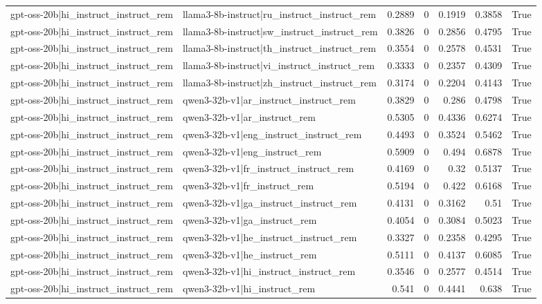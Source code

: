 \begin{table}
\begin{tabular}{l l r r r r l}
gpt-oss-20b|hi_instruct_instruct_rem & llama3-8b-instruct|ru_instruct_instruct_rem & 0.2889 & 0 & 0.1919 & 0.3858 & True \\
gpt-oss-20b|hi_instruct_instruct_rem & llama3-8b-instruct|sw_instruct_instruct_rem & 0.3826 & 0 & 0.2856 & 0.4795 & True \\
gpt-oss-20b|hi_instruct_instruct_rem & llama3-8b-instruct|th_instruct_instruct_rem & 0.3554 & 0 & 0.2578 & 0.4531 & True \\
gpt-oss-20b|hi_instruct_instruct_rem & llama3-8b-instruct|vi_instruct_instruct_rem & 0.3333 & 0 & 0.2357 & 0.4309 & True \\
gpt-oss-20b|hi_instruct_instruct_rem & llama3-8b-instruct|zh_instruct_instruct_rem & 0.3174 & 0 & 0.2204 & 0.4143 & True \\
gpt-oss-20b|hi_instruct_instruct_rem & qwen3-32b-v1|ar_instruct_instruct_rem & 0.3829 & 0 & 0.286 & 0.4798 & True \\
gpt-oss-20b|hi_instruct_instruct_rem & qwen3-32b-v1|ar_instruct_rem & 0.5305 & 0 & 0.4336 & 0.6274 & True \\
gpt-oss-20b|hi_instruct_instruct_rem & qwen3-32b-v1|eng_instruct_instruct_rem & 0.4493 & 0 & 0.3524 & 0.5462 & True \\
gpt-oss-20b|hi_instruct_instruct_rem & qwen3-32b-v1|eng_instruct_rem & 0.5909 & 0 & 0.494 & 0.6878 & True \\
gpt-oss-20b|hi_instruct_instruct_rem & qwen3-32b-v1|fr_instruct_instruct_rem & 0.4169 & 0 & 0.32 & 0.5137 & True \\
gpt-oss-20b|hi_instruct_instruct_rem & qwen3-32b-v1|fr_instruct_rem & 0.5194 & 0 & 0.422 & 0.6168 & True \\
gpt-oss-20b|hi_instruct_instruct_rem & qwen3-32b-v1|ga_instruct_instruct_rem & 0.4131 & 0 & 0.3162 & 0.51 & True \\
gpt-oss-20b|hi_instruct_instruct_rem & qwen3-32b-v1|ga_instruct_rem & 0.4054 & 0 & 0.3084 & 0.5023 & True \\
gpt-oss-20b|hi_instruct_instruct_rem & qwen3-32b-v1|he_instruct_instruct_rem & 0.3327 & 0 & 0.2358 & 0.4295 & True \\
gpt-oss-20b|hi_instruct_instruct_rem & qwen3-32b-v1|he_instruct_rem & 0.5111 & 0 & 0.4137 & 0.6085 & True \\
gpt-oss-20b|hi_instruct_instruct_rem & qwen3-32b-v1|hi_instruct_instruct_rem & 0.3546 & 0 & 0.2577 & 0.4514 & True \\
gpt-oss-20b|hi_instruct_instruct_rem & qwen3-32b-v1|hi_instruct_rem & 0.541 & 0 & 0.4441 & 0.638 & True \\

\end{tabular}
\end{table}
